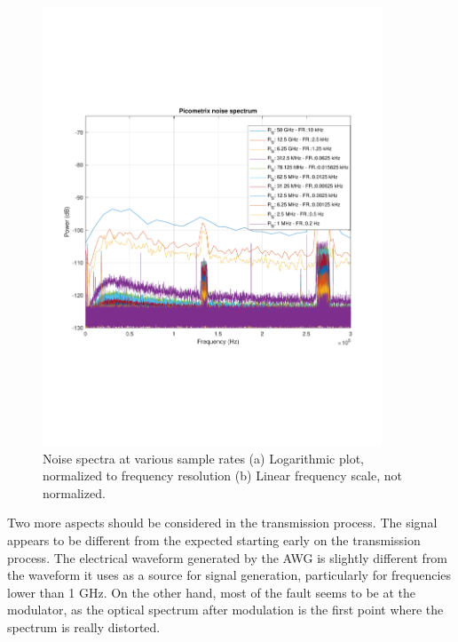 \begin{figure}[H]
\begin{minipage}{0.45\textwidth}
			\includegraphics[clip, trim=1cm 6cm 1cm 6cm,
			width=0.9\textwidth]{./sdf/m_qam_system/figures/experimental/noiseSpectra/picoNoiseComp.pdf}
			\subcaption{\label{fig:noise50m}}
		\end{minipage}
		\caption{Noise spectra at various sample rates (a) Logarithmic plot, normalized to frequency resolution (b) Linear frequency scale, not normalized.\label{fig:noiseVariations}}
	\end{figure}

	Two more aspects should be considered in the transmission process. The signal
	appears to be different from the expected starting early on the transmission
	process. The electrical waveform generated by the AWG is slightly different
	from the waveform it uses as a source for signal generation, particularly for
	frequencies lower than 1 GHz. On the other hand, most of the fault seems to be
	at the modulator, as the optical spectrum after modulation is the first point
	where the spectrum is really distorted.

